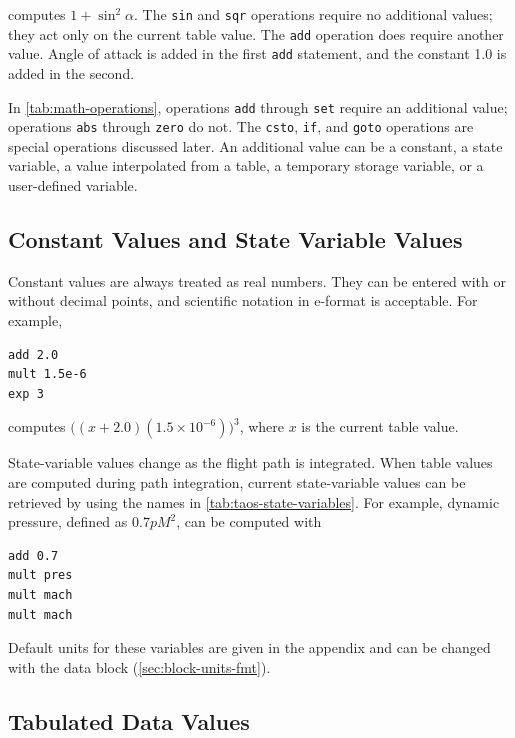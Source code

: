 computes $1+\sin^2\alpha$. The \texttt{sin} and \texttt{sqr} operations require no
additional values; they act only on the current table value. The \texttt{add}
operation does require another value. Angle of attack is added in the first
\texttt{add} statement, and the constant 1.0 is added in the second.

In \cref{tab:math-operations}, operations \texttt{add} through \texttt{set} require
an additional value; operations \texttt{abs} through \texttt{zero} do not. The
\texttt{csto}, \texttt{if}, and \texttt{goto} operations are special operations
discussed later. An additional value can be a constant, a state variable, a value
interpolated from a table, a temporary storage variable, or a user-defined variable.

\subsection{Constant Values and State Variable Values}\label{sec:table-constant-state-values}

Constant values are always treated as real numbers. They can be entered with or
without decimal points, and scientific notation in e-format is acceptable. For
example,

\begin{lstlisting}[style=taosmanual]
add 2.0
mult 1.5e-6
exp 3
\end{lstlisting}

computes $\bigl((x+2.0)(1.5\times10^{-6})\bigr)^3$, where $x$ is the current table
value.

State-variable values change as the flight path is integrated. When table values are
computed during path integration, current state-variable values can be retrieved by
using the names in \cref{tab:taos-state-variables}. For example, dynamic pressure,
defined as $0.7pM^2$, can be computed with

\begin{lstlisting}[style=taosmanual]
add 0.7
mult pres
mult mach
mult mach
\end{lstlisting}

Default units for these variables are given in the appendix and can be changed with
the  data block (\cref{sec:block-units-fmt}).

\subsection{Tabulated Data Values}\label{sec:tabulated-data-values}

